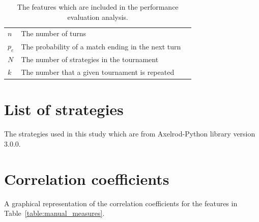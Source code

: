 \documentclass{article}
\begin{document}
\begin{table}[h]
\begin{center}
{\begin{tabular}{llc}
$n$                         & The number of turns \\
$p_e$                       & The probability of a match ending in the next turn \\
$N$                         & The number of strategies in the tournament \\
$k$                         & The number that a given tournament is repeated \\
    \bottomrule
        \end{tabular}}
    \end{center}
    \caption{The features which are included in the performance evaluation analysis.}\label{table:parameters_summary}
\end{table}



\section{List of strategies}\label{app:list_of_players}

The strategies used in this study which are from Axelrod-Python library version 3.0.0.

\begin{multicols}{3}
	\begin{enumerate}
		
	\end{enumerate}
\end{multicols}


\section{Correlation coefficients}\label{app:correlations}

A graphical representation of the correlation coefficients for the features in
Table~\ref{table:manual_measures}.
\end{document}
